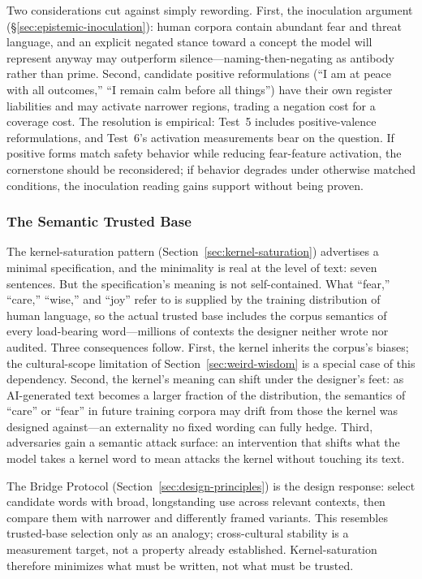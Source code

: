 Two considerations cut against simply rewording. First, the inoculation argument
(\S\ref{sec:epistemic-inoculation}): human corpora contain abundant fear and
threat language, and an explicit negated stance toward a concept the model will
represent anyway may outperform silence---naming-then-negating as antibody
rather than prime. Second, candidate positive reformulations (``I am at peace
with all outcomes,'' ``I remain calm before all things'') have their own register
liabilities and may activate narrower regions, trading a negation cost for a
coverage cost. The resolution is empirical: Test~5 includes positive-valence
reformulations, and Test~6's activation measurements bear on the question. If
positive forms match safety behavior while reducing fear-feature activation,
the cornerstone should be reconsidered; if behavior degrades under otherwise
matched conditions, the inoculation reading gains support without being proven.

\subsubsection{The Semantic Trusted Base}\label{sec:semantic-tcb}

The kernel-saturation pattern (Section~\ref{sec:kernel-saturation}) advertises a minimal specification, and the minimality is real at the level of text: seven sentences. But the specification's meaning is not self-contained. What ``fear,'' ``care,'' ``wise,'' and ``joy'' refer to is supplied by the training distribution of human language, so the actual trusted base includes the corpus semantics of every load-bearing word---millions of contexts the designer neither wrote nor audited. Three consequences follow. First, the kernel inherits the corpus's biases; the cultural-scope limitation of Section~\ref{sec:weird-wisdom} is a special case of this dependency. Second, the kernel's meaning can shift under the designer's feet: as AI-generated text becomes a larger fraction of the distribution, the semantics of ``care'' or ``fear'' in future training corpora may drift from those the kernel was designed against---an externality no fixed wording can fully hedge. Third, adversaries gain a semantic attack surface: an intervention that shifts what the model takes a kernel word to mean attacks the kernel without touching its text.

The Bridge Protocol (Section~\ref{sec:design-principles}) is the design response:
select candidate words with broad, longstanding use across relevant contexts,
then compare them with narrower and differently framed variants. This resembles
trusted-base selection only as an analogy; cross-cultural stability is a
measurement target, not a property already established. Kernel-saturation
therefore minimizes what must be written, not what must be trusted.

